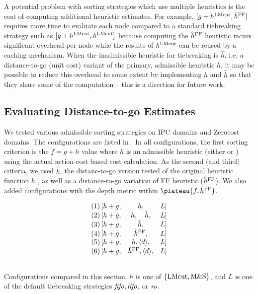 A potential problem with sorting strategies which use multiple heuristics is the cost of computing additional
heuristic estimates. For example, $[g+h^{\text{LMcut}},\hat{h}^{\text{FF}}]$ requires more time to evaluate each node compared to a standard tiebreaking strategy such as $[g+h^{\text{LMcut}},h^{\text{LMcut}}]$ because computing the $\hat{h}^{\text{FF}}$ heuristic incurs significant overhead per node while the results of $h^{\text{LMcut}}$ can be reused by a caching mechanism.
When the inadmissible heuristic for tiebreaking is $\hat{h}$, i.e. a distance-to-go (unit cost) variant of the primary, admissible heuristic $h$, it may be possible to reduce this overhead to some extent by implementing $h$ and $\hat{h}$ so that they share some of the computation  -- this is a direction for future work.

\subsection{Evaluating Distance-to-go Estimates}

We tested various admissible sorting strategies on IPC domains and Zerocost domains.
The configurations are listed in . 
In all configurations, the first sorting criterion is the $f=g+h$ value
where $h$ is an admissible heuristic (either \lmcut or \mands) using the actual action-cost based  cost calculation.
As the second (and third) criteria,
we used $\hat{h}$, the distanc-to-go version tested  of the original heuristic function $h$ , as well as a distance-to-go variation of FF
heuristic ($\hat{h}^{\text{FF}}$).
We also added configurations with the depth metric within
$\plateau{f,\hat{h}^{\text{\ff}}}$.

\begin{table}[htbp]
 \centering
 \[
 \begin{array}{lcll}
  (1)\, [h+g, & h,                           &L] \\\relax
  (2)\, [h+g, & h,     \quad   \hat{h},      &L] \\\relax
  (3)\, [h+g, & \hat{h},                     &L] \\\relax
  (4)\, [h+g, & \hat{h}^{\text{FF}},               &L] \\\relax
  (5)\, [h+g, & h, {\left<d\right>}, &L] \\\relax
  (6)\, [h+g, & \hat{h}^{\text{FF}}, {\left<d\right>}, &L] \\\relax
 \end{array}  
 \]
 \caption{Configurations compared in this section. $h$ is
 one of ${\left\{\text{LMcut}, \text{M\&S}\right\}}$, and $L$ is one of the default
 tiebreaking strategies ${\text{\textit{fifo}}},{\text{\textit{lifo}}},$ or ${\text{\textit{ro}}}$. }
 \label{list:distance-configs}
\end{table}

